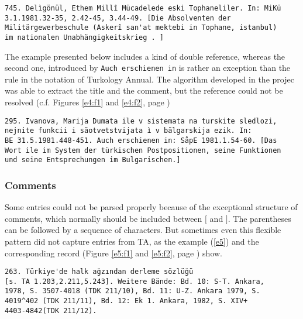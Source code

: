\documentclass{scrartcl}
\begin{document}
\begin{example}
\begin{verbatim}
745. Delìgönül, Ethem Millî Mücadelede eski Tophaneliler. In: MiKü
3.1.1981.32-35, 2.42-45, 3.44-49. [Die Absolventen der 
Militärgewerbeschule (Askerî san'at mektebi in Tophane, istanbul) 
im nationalen Unabhängigkeitskrieg . ] 
\end{verbatim}
\label{e3} 
\end{example}

The example presented below includes a kind of double reference, whereas the
second one, introduced by \verb+Auch erschienen in+ is rather an exception than
the rule in the notation of Turkology Annual. The algorithm developed in the
projec was able to extract the title and the comment, but the reference could
not be resolved (c.f. Figures \ref{e4:f1} and \ref{e4:f2}, page \pageref{e4:f1})

\begin{example}
\begin{verbatim}
295. Ivanova, Marija Dumata ile v sistemata na turskite sledlozi, 
nejnite funkcii i săotvetstvijata ì v bălgarskija ezik. In: 
BE 31.5.1981.448-451. Auch erschienen in: SåpE 1981.1.54-60. [Das
Wort ile im System der türkischen Postpositionen, seine Funktionen
und seine Entsprechungen im Bulgarischen.]
\end{verbatim}
\label{e4} 
\end{example}

\subsubsection{Comments}
Some entries could not be parsed properly because of the exceptional structure
of comments, which normally should be included between $[$ and $]$. The
parentheses can be followed by a sequence of characters. But sometimes even this
flexible pattern did not capture entries from TA, as the example (\ref{e5}) and
the corresponding record (Figure \ref{e5:f1} and \ref{e5:f2}, page \pageref{e5:f1})
show.

\begin{example}
\begin{verbatim}
263. Türkiye'de halk ağzından derleme sözlüğü 
[s. TA 1.203,2.211,5.243]. Weitere Bände: Bd. 10: S-T. Ankara,
1978, S. 3507-4018 (TDK 211/10), Bd. 11: U-Z. Ankara 1979, S. 
4019^402 (TDK 211/11), Bd. 12: Ek 1. Ankara, 1982, S. XIV+
4403-4842(TDK 211/12).
\end{verbatim}
\label{e5} 
\end{example}
\end{document}
